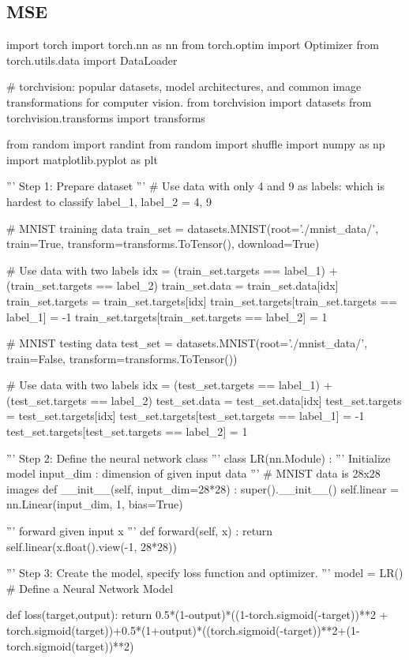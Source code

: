 \documentclass[10pt]{article}
\begin{document}
\subsection{MSE}
\begin{python}
    import torch
import torch.nn as nn
from torch.optim import Optimizer
from torch.utils.data import DataLoader

# torchvision: popular datasets, model architectures, and common image transformations for computer vision.
from torchvision import datasets
from torchvision.transforms import transforms

from random import randint
from random import shuffle
import numpy as np
import matplotlib.pyplot as plt


'''
Step 1: Prepare dataset
'''
# Use data with only 4 and 9 as labels: which is hardest to classify
label_1, label_2 = 4, 9

# MNIST training data
train_set = datasets.MNIST(root='./mnist_data/', train=True, transform=transforms.ToTensor(), download=True)

# Use data with two labels
idx = (train_set.targets == label_1) + (train_set.targets == label_2)
train_set.data = train_set.data[idx]
train_set.targets = train_set.targets[idx]
train_set.targets[train_set.targets == label_1] = -1
train_set.targets[train_set.targets == label_2] = 1

# MNIST testing data
test_set = datasets.MNIST(root='./mnist_data/', train=False, transform=transforms.ToTensor())

# Use data with two labels
idx = (test_set.targets == label_1) + (test_set.targets == label_2)
test_set.data = test_set.data[idx]
test_set.targets = test_set.targets[idx]
test_set.targets[test_set.targets == label_1] = -1
test_set.targets[test_set.targets == label_2] = 1

'''
Step 2: Define the neural network class
'''
class LR(nn.Module) :
    '''
    Initialize model
        input_dim : dimension of given input data
    '''
    # MNIST data is 28x28 images
    def __init__(self, input_dim=28*28) :
        super().__init__()
        self.linear = nn.Linear(input_dim, 1, bias=True)

    ''' forward given input x '''
    def forward(self, x) :
        return self.linear(x.float().view(-1, 28*28))

'''
Step 3: Create the model, specify loss function and optimizer.
'''
model = LR()                                   # Define a Neural Network Model

def loss(target,output):
    return 0.5*(1-output)*((1-torch.sigmoid(-target))**2 + torch.sigmoid(target))+0.5*(1+output)*((torch.sigmoid(-target))**2+(1-torch.sigmoid(target))**2)


\end{python}
\end{document}
